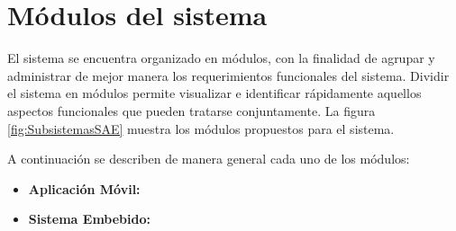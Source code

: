 
\section{Módulos del sistema}

El sistema se encuentra organizado en módulos, con la finalidad de agrupar y administrar de mejor manera los requerimientos funcionales del sistema. Dividir el sistema en módulos permite visualizar e identificar rápidamente aquellos aspectos funcionales que pueden tratarse conjuntamente. La figura \ref{fig:SubsistemasSAE} muestra los módulos propuestos para el sistema.


A continuación se describen de manera general cada uno de los módulos:

\begin{itemize}
	\item {\bf Aplicación Móvil:}
	
	\item {\bf Sistema Embebido:} 
	
	
\end{itemize}
\pagebreak